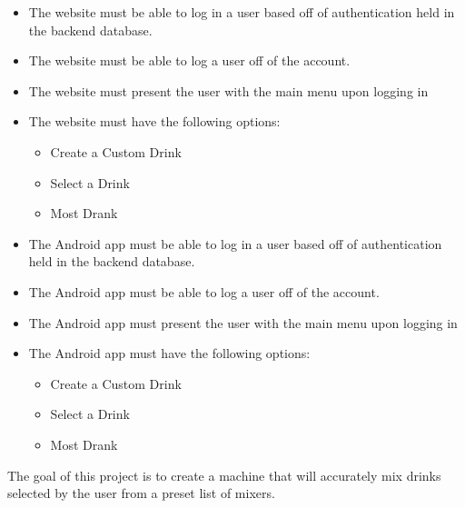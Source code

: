 {    \begin{itemize}
		\item The website must be able to log in a user based off of 
        authentication held in the backend database.
		\item The website must be able to log a user off of the account.
		\item The website must present the user with the main menu upon 
        logging in
		\item The website must have the following options:
        \begin{itemize}
			\item Create a Custom Drink
			\item Select a Drink
			\item Most Drank
        \end{itemize}
		\item The Android app must be able to log in a user based off of 
        authentication held in the backend database.
		\item The Android app must be able to log a user off of the account.
		\item The Android app must present the user with the main menu upon 
        logging in
		\item The Android app must have the following options:
        \begin{itemize}
			\item Create a Custom Drink
			\item Select a Drink
			\item Most Drank
        \end{itemize}
    \end{itemize}

    The goal of this project is to create a machine that will accurately mix 
    drinks selected by the user from a preset list of mixers.  

}
